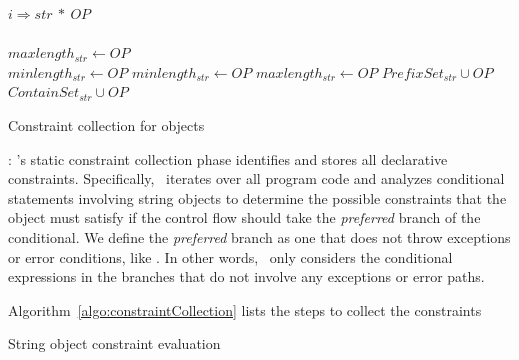\begin{algorithm}[t]
\scriptsize
\DontPrintSemicolon
{}
\Begin
{
  {
   $i \Rightarrow str\ *\ OP$ \\
    {\\
   \mytab $maxlength_{str} \longleftarrow OP$\\
   \mytab $minlength_{str} \longleftarrow OP$
   }  {
    $minlength_{str} \longleftarrow OP$
   }  {
    $maxlength_{str} \longleftarrow OP$
   }  {
    $PrefixSet_{str} \cup OP$
   }  {
    $ContainSet_{str} \cup OP$
   }
  }
}
\caption{Constraint collection for  objects}
\label{algo:constraintCollection}
\end{algorithm}

: \tool's static constraint collection
phase identifies and stores all declarative constraints. Specifically, \tool\
iterates over all program code and analyzes conditional statements involving
string objects to determine the possible constraints that the object must
satisfy if the control flow should take the \textit{preferred} branch of the
conditional. We define the \textit{preferred} branch as one that does not throw
exceptions or error conditions, like \code{System.err.print()}. In other words,
\tool\ only considers the conditional expressions in the branches that do not
involve any exceptions or error paths.

Algorithm~\ref{algo:constraintCollection} lists the steps to collect the
constraints 


\begin{algorithm}[t]
\scriptsize
\DontPrintSemicolon
{}
\caption{String object constraint evaluation}
\label{algo:constraint}
\end{algorithm}

